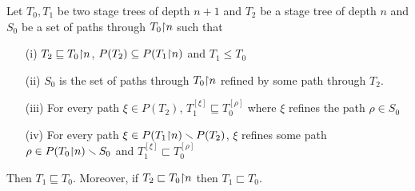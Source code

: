 \begin{lemma}\label{lem:sq-concatenation}
Let $T_0, T_1$ be two stage trees of depth $n+1$ and $T_2$ be a stage tree of depth $n$ 
and $S_0$ be a set of paths through $T_0 {\upharpoonright} n$ such that
\begin{itemize}
	\item[(i)] $T_2 \sqsubseteq T_0 {\upharpoonright} n$, $P(T_2) \subseteq P(T_1 {\upharpoonright} n)$ and $T_1 \leq T_0$
	\item[(ii)] $S_0$ is the set of paths through $T_0 {\upharpoonright} n$ refined by some path through $T_2$.
	\item[(iii)] For every path $\xi \in P(T_2)$, $T_1^{[\xi]} \sqsubseteq T_0^{[\rho]}$ where $\xi$ refines the path $\rho \in S_0$	
	\item[(iv)] For every path $\xi \in P(T_1 {\upharpoonright} n) \smallsetminus P(T_2)$, $\xi$ refines some path $\rho \in P(T_0 {\upharpoonright} n) \smallsetminus S_0$
	and $T_1^{[\xi]} \sqsubset T_0^{[\rho]}$
\end{itemize}
Then $T_1 \sqsubseteq T_0$. Moreover, if $T_2 \sqsubset T_0 {\upharpoonright} n$ then $T_1 \sqsubset T_0$.
\end{lemma}
